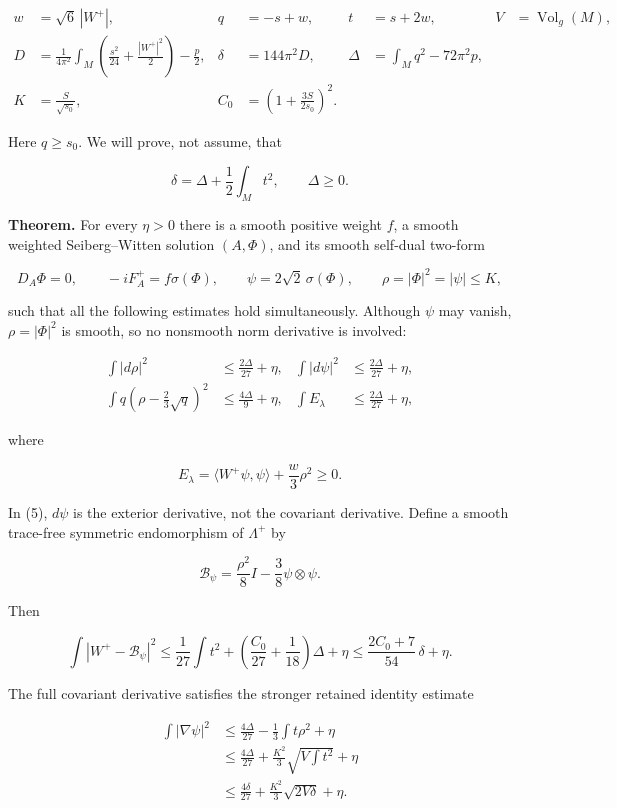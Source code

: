 \documentclass[
  11pt,
]{article}
\begin{document}
\[
\begin{aligned}
 w&=\sqrt6\,|W^+|, &q&=-s+w, &t&=s+2w, &V&=\operatorname{Vol}_g(M),\\
 D&=\frac1{4\pi^2}\int_M
       \left(\frac{s^2}{24}+\frac{|W^+|^2}{2}\right)-\frac p2,
 &\delta&=144\pi^2D,
 &\Delta&=\int_Mq^2-72\pi^2p,\\
 K&=\frac S{\sqrt{s_0}},
 &C_0&=\left(1+\frac{3S}{2s_0}\right)^2.
\end{aligned}
\tag{2}
\]

Here \(q\ge s_0\). We will prove, not assume, that

\[
 \boxed{\delta=\Delta+\frac12\int_Mt^2,\qquad\Delta\ge0.}
 \tag{3}
\]

\textbf{Theorem.} For every \(\eta>0\) there is a smooth positive weight
\(f\), a smooth weighted Seiberg--Witten solution \((A,\Phi)\), and its
smooth self-dual two-form

\[
 D_A\Phi=0,\qquad -iF_A^+=f\sigma(\Phi),\qquad
 \psi=2\sqrt2\,\sigma(\Phi),\qquad
 \rho=|\Phi|^2=|\psi|\le K,
 \tag{4}
\]

such that all the following estimates hold simultaneously. Although
\(\psi\) may vanish, \(\rho=|\Phi|^2\) is smooth, so no nonsmooth norm
derivative is involved:

\[
\begin{aligned}
 \int|d\rho|^2&\le\frac{2\Delta}{27}+\eta,
 &\int|d\psi|^2&\le\frac{2\Delta}{27}+\eta,\\
 \int q\left(\rho-\frac23\sqrt q\right)^2
   &\le\frac{4\Delta}{9}+\eta,
 &\int E_\lambda&\le\frac{2\Delta}{27}+\eta,
\end{aligned}
\tag{5}
\]

where

\[
 E_\lambda=\langle W^+\psi,\psi\rangle+\frac w3\rho^2\ge0.
 \tag{6}
\]

In (5), \(d\psi\) is the exterior derivative, not the covariant
derivative. Define a smooth trace-free symmetric endomorphism of
\(\Lambda^+\) by

\[
 \mathcal B_\psi=\frac{\rho^2}{8}I-\frac38\psi\otimes\psi.
 \tag{7}
\]

Then

\[
 \boxed{
 \int|W^+-\mathcal B_\psi|^2
 \le\frac1{27}\int t^2+
       \left(\frac{C_0}{27}+\frac1{18}\right)\Delta+\eta
 \le\frac{2C_0+7}{54}\,\delta+\eta.}
 \tag{8}
\]

The full covariant derivative satisfies the stronger retained identity
estimate

\[
\begin{aligned}
 \int|\nabla\psi|^2
 &\le\frac{4\Delta}{27}-\frac13\int t\rho^2+\eta\\
 &\le\frac{4\Delta}{27}+
          \frac{K^2}{3}\sqrt{V\int t^2}+\eta\\
 &\le\frac{4\delta}{27}+\frac{K^2}{3}\sqrt{2V\delta}+\eta.
\end{aligned}
\tag{9}
\]
\end{document}
